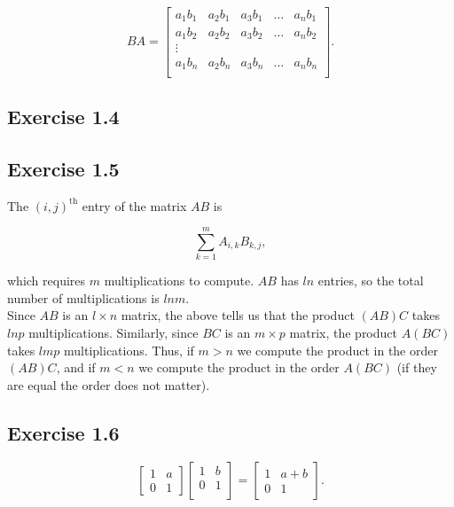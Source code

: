 \documentclass{article}
\begin{document}
\[
    BA
    =
    \begin{bmatrix}
    a_1 b_1 & a_2 b_1 & a_3 b_1 & \dots & a_n b_1\\
    a_1 b_2 & a_2 b_2 & a_3 b_2 & \dots & a_n b_2\\
    \vdots \\
    a_1 b_n & a_2 b_n & a_3 b_n & \dots & a_n b_n\\
    \end{bmatrix}.
\]

\subsection*{Exercise 1.4}

\subsection*{Exercise 1.5}

The $(i,j)^{\text{th}}$ entry of the matrix $AB$ is

$$
\sum_{k=1}^m A_{i,k} B_{k,j},
$$

which requires $m$ multiplications to compute. $AB$ has $ln$  entries, so the total number of multiplications is $lnm$.\\


Since $AB$ is an $l\times n$ matrix, the above tells us that the product $(AB)C$ takes $lnp$ multiplications. Similarly, since $BC$ is an $m\times p$ matrix, the product $A(BC)$ takes $lmp$ multiplications. Thus, if $m>n$ we compute the product in the order $(AB)C$, and if $m<n$ we compute the product in the order $A(BC)$ (if they are equal the order does not matter).

\subsection*{Exercise 1.6}

\[
    \begin{bmatrix}
    1 & a\\
    0 & 1
    \end{bmatrix}
    \begin{bmatrix}
    1 & b\\
    0 & 1\\
    \end{bmatrix}
    =
    \begin{bmatrix}
    1 & a+b\\
    0 & 1
    \end{bmatrix}.
\]
\end{document}
